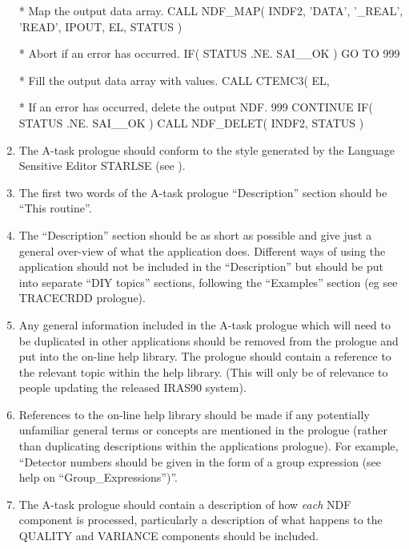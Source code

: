 \documentclass[twoside,11pt,nolof]{starlink}
\begin{document}
\begin{enumerate}
\begin{terminalv}
*  Map the output data array.
      CALL NDF_MAP( INDF2, 'DATA', '_REAL', 'READ', IPOUT, EL, STATUS )

*  Abort if an error has occurred.
      IF( STATUS .NE. SAI__OK ) GO TO 999

*  Fill the output data array with values.
      CALL CTEMC3( EL, %

*  If an error has occurred, delete the output NDF.
 999  CONTINUE
      IF( STATUS .NE. SAI__OK ) CALL NDF_DELET( INDF2, STATUS )
\end{terminalv}
\normalsize

\item The A-task prologue should conform to the style generated by the Language
Sensitive Editor {\small STARLSE}
(see ).

\item The first two words of the A-task prologue ``Description'' section should be ``This
routine''.

\item The ``Description'' section should be as short as possible and give just a
general over-view of what the application does. Different ways of using the
application should not be included in the ``Description'' but should be put into
separate ``DIY topics'' sections, following the ``Examples'' section (eg see
{\small TRACECRDD} prologue).

\item Any general information included in the A-task prologue which will need to
be duplicated in other applications should be removed from the prologue and put
into the on-line help library. The prologue should contain a reference to the
relevant topic within the help library. (This will only be of relevance to
people updating the released {\small IRAS90} system).

\item References to the on-line help library should be made if any potentially
unfamiliar general terms or concepts are mentioned in the prologue (rather than
duplicating descriptions within the applications prologue). For example,
``Detector numbers should be given in the form of a group expression (see help
on ``Group\_Expressions'')''.

\item The A-task prologue should contain a description of how \emph{each} {\small NDF}
component is processed, particularly a description of what happens to the
{\small QUALITY} and {\small VARIANCE} components should be included.


\end{enumerate}
\end{document}
